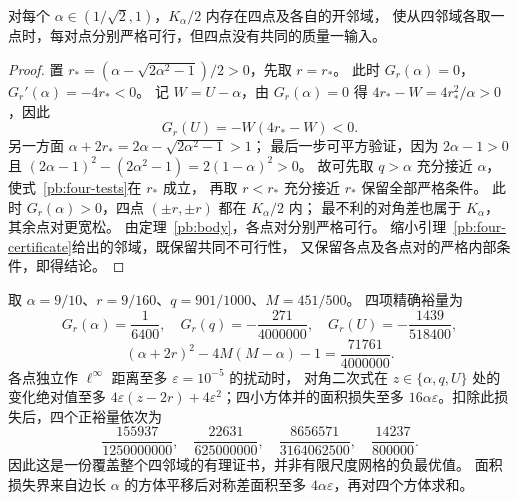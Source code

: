 \begin{proposition}[每个高阈值都有严格四点障碍]\label{pb:four-existence}
对每个 $\alpha\in(1/\sqrt2,1)$，$K_\alpha/2$ 内存在四点及各自的开邻域，
使从四邻域各取一点时，每对点分别严格可行，但四点没有共同的质量一输入。
\end{proposition}
\begin{proof}
置 $r_*=(\alpha-\sqrt{2\alpha^2-1})/2>0$，先取 $r=r_*$。
此时 $G_r(\alpha)=0$，$G_r'(\alpha)=-4r_*<0$。
记 $W=U-\alpha$，由 $G_r(\alpha)=0$ 得
$4r_*-W=4r_*^2/\alpha>0$，因此
\[
 G_r(U)=-W(4r_*-W)<0.
\]
另一方面
$\alpha+2r_*=2\alpha-\sqrt{2\alpha^2-1}>1$；
最后一步可平方验证，因为 $2\alpha-1>0$ 且
$(2\alpha-1)^2-(2\alpha^2-1)=2(1-\alpha)^2>0$。
故可先取 $q>\alpha$ 充分接近 $\alpha$，使式~\eqref{pb:four-tests}在 $r_*$ 成立，
再取 $r<r_*$ 充分接近 $r_*$ 保留全部严格条件。
此时 $G_r(\alpha)>0$，四点 $(\pm r,\pm r)$ 都在 $K_\alpha/2$ 内；
最不利的对角差也属于 $K_\alpha$，其余点对更宽松。
由定理~\ref{pb:body}，各点对分别严格可行。
缩小引理~\ref{pb:four-certificate}给出的邻域，既保留共同不可行性，
又保留各点及各点对的严格内部条件，即得结论。
\end{proof}

\begin{example}[有理且抗扰动的证书]\label{pb:four-rational}
取 $\alpha=9/10$、$r=9/160$、$q=901/1000$、$M=451/500$。
四项精确裕量为
\[
 G_r(\alpha)=\frac1{6400},\quad G_r(q)=-\frac{271}{4000000},\quad
 G_r(U)=-\frac{1439}{518400},
\]
\[
 (\alpha+2r)^2-4M(M-\alpha)-1=\frac{71761}{4000000}.
\]
各点独立作 $\ell^\infty$ 距离至多 $\varepsilon=10^{-5}$ 的扰动时，
对角二次式在 $z\in\{\alpha,q,U\}$ 处的变化绝对值至多
$4\varepsilon(z-2r)+4\varepsilon^2$；四小方体并的面积损失至多
$16\alpha\varepsilon$。扣除此损失后，四个正裕量依次为
\[
 \frac{155937}{1250000000},\quad\frac{22631}{625000000},\quad
 \frac{8656571}{3164062500},\quad\frac{14237}{800000}.
\]
因此这是一份覆盖整个四邻域的有理证书，并非有限尺度网格的负最优值。
面积损失界来自边长 $\alpha$ 的方体平移后对称差面积至多
$4\alpha\varepsilon$，再对四个方体求和。
\end{example}

